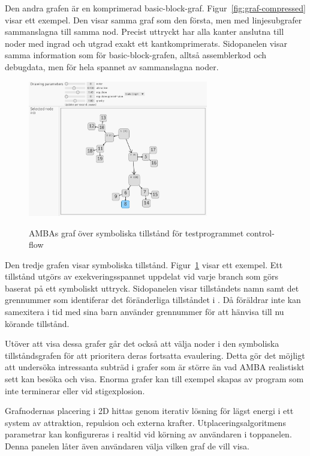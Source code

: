 Den andra grafen är en komprimerad basic-block-graf.
Figur~\ref{fig:graf-compressed} visar ett exempel. Den visar samma graf som den
första, men med linjesubgrafer sammanslagna till samma nod. Precist uttryckt har
alla kanter anslutna till noder med ingrad och utgrad exakt ett
kantkomprimerats. Sidopanelen visar samma information som för basic-block-grafen, alltså assemblerkod och debugdata, men för hela spannet av sammanslagna noder.

\begin{figure}
    \centering
    \includegraphics[width=0.7\textwidth]{figures/graph_symbolic.png}\label{fig:graf-symbolic}
    \caption{AMBAs graf över symboliska tillstånd för testprogrammet control-flow}
\end{figure}

Den tredje grafen visar symboliska tillstånd. Figur~\ref{fig:graf-symbolic}
visar ett exempel. Ett tillstånd utgörs av exekveringsspannet uppdelat vid varje
branch som görs baserat på ett symboliskt uttryck. Sidopanelen visar
tillståndets namn samt det grennummer som identiferar det föränderliga
tillståndet i \stoe{}. Då föräldrar inte kan samexitera i tid med sina barn
använder \stoe{} grennummer för att hänvisa till nu körande tillstånd.

Utöver att visa dessa grafer går det också att välja noder i den symboliska
tillståndsgrafen för att prioritera deras fortsatta evaulering. Detta gör det
möjligt att undersöka intressanta subträd i grafer som är större än vad AMBA
realistiskt sett kan besöka och visa. Enorma grafer kan till exempel skapas av
program som inte terminerar eller vid stigexplosion.

Grafnodernas placering i 2D hittas genom iterativ lösning för lägst energi i ett
system av attraktion, repulsion och externa krafter. Utplaceringsalgoritmens
parametrar kan konfigureras i realtid vid körning av användaren i toppanelen.
Denna panelen låter även användaren välja vilken graf de vill visa.

